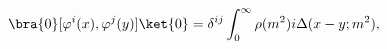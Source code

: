 \begin{equation}
\bra{0} [\varphi^i(x),\varphi^j(y)] \ket{0}
=\delta^{ij}\int_0^\infty \rho(m^2) i\Delta (x-y;m^2), \label{kallen-lehmann2}
\end{equation}

